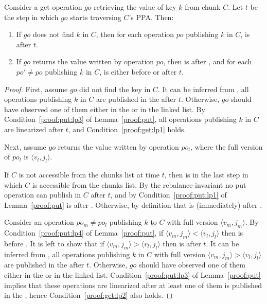 \begin{lemma}
\label{proof:get}
Consider a get operation $go$ retrieving the value of key $k$ from chunk $C$. Let $t$ be the step in which $go$ starts traversing $C$'s {PPA}. Then:
\begin{enumerate}
\setlength{\itemsep}{0pt}
\setlength{\parskip}{0pt}
\item \label{proof:get:lp1} If $go$ does not find $k$ in $C$, then for each operation $po$ publishing $k$ in $C$,  is after $t$.
\item \label{proof:get:lp2} If $go$ returns the value written by operation $po$, then  is after , and for each  $po' \neq po$ publishing $k$ in $C$,  is either before  or after $t$.
\end{enumerate}
\end{lemma}
\begin{proof}

First, assume $go$ did not find the key in $C$. It can be inferred from , all operations publishing $k$ in $C$ are published in the  after $t$. Otherwise, $go$ should have observed one of them either in the  or in the linked list. By Condition~\ref{proof:put:lp3} of Lemma~\ref{proof:put}, all operations publishing $k$ in $C$ are linearized after $t$, and Condition~\ref{proof:get:lp1} holds.

Next, assume $go$ returns the value written by operation $po_l$, where the full version of $po_l$ is $\langle v_l, j_l\rangle$. 

If $C$ is not accessible from the chunks list at time $t$, then  is in the last step in which $C$ is accessible from the chunks list. By the rebalance invariant no put operation can publish in $C$ after $t$, and by Condition~\ref{proof:put:lp1} of Lemma~\ref{proof:put}   is after . Otherwise, by definition that  is (immediately) after  .

Consider an operation $po_m \neq po_l$ publishing $k$ to $C$ with full version $\langle v_m, j_m\rangle$.
By Condition~\ref{proof:put:lp4} of Lemma~\ref{proof:put}, if $\langle v_m, j_m\rangle < \langle v_l, j_l\rangle$ then  is before . It is left to show that if $\langle v_m, j_m\rangle > \langle v_l, j_l\rangle$ then  is after $t$.
It can be inferred from , all operations publishing $k$ in $C$ with full version $\langle v_m, j_m\rangle > \langle v_l, j_l\rangle$ are published in the  after $t$. Otherwise, $go$ should have observed one of them either in the  or in the linked list.
Condition~\ref{proof:put:lp3} of Lemma~\ref{proof:put} implies that these operations are linearized after at least one of them is published in the , hence Condition~\ref{proof:get:lp2} also holds.
\end{proof}

